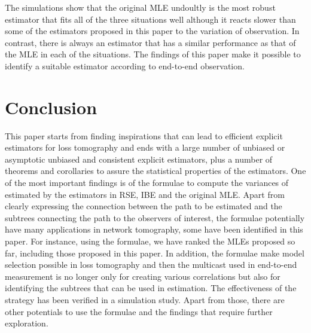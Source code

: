 \documentclass[10pt,onecolumn]{IEEEtran}
\begin{document}
The simulations show that the original MLE undoultly is the most robust estimator that fits all of the three situations well although it reacts slower than some of the estimators proposed in this paper to the variation of observation. In contrast,  there is always an estimator that has a similar performance as that of the MLE in each of the situations. 
 The findings of this paper make it  possible to identify a suitable estimator according to end-to-end observation.















\section{Conclusion}\label{section7}

This paper starts from finding inspirations that can lead to efficient explicit estimators for loss tomography and ends with a large number of unbiased or asymptotic unbiased and consistent explicit estimators, plus a number of theorems and corollaries to assure the statistical properties of the estimators. One of the most important findings is of the formulae to compute the variances of  estimated by the estimators in RSE, IBE and the original MLE. Apart from clearly expressing the connection between the path to be estimated and the subtrees connecting the path to the observers of interest, the formulae potentially have many applications in network tomography, some have been identified in this paper.  For instance, using the formulae, we have ranked the MLEs proposed so far, including those proposed  in this paper. In addition, the formulae make model selection possible in loss tomography and then the multicast used in end-to-end measurement is no longer only for creating various correlations but also for identifying the subtrees that can be used in estimation. The effectiveness of the strategy has been verified in a simulation study. Apart from those, there are other potentials to use the formulae and the findings that require further exploration.






\end{document}
